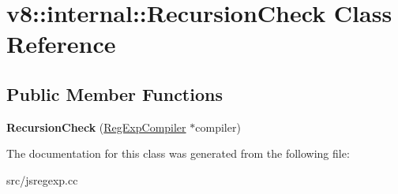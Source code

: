 \hypertarget{classv8_1_1internal_1_1_recursion_check}{}\section{v8\+:\+:internal\+:\+:Recursion\+Check Class Reference}
\label{classv8_1_1internal_1_1_recursion_check}
\subsection*{Public Member Functions}
\begin{DoxyCompactItemize}
\item 
\hypertarget{classv8_1_1internal_1_1_recursion_check_a35c0b952b582e12ff1307c6e804b4d90}{}{\bfseries Recursion\+Check} (\hyperlink{classv8_1_1internal_1_1_reg_exp_compiler}{Reg\+Exp\+Compiler} $\ast$compiler)\label{classv8_1_1internal_1_1_recursion_check_a35c0b952b582e12ff1307c6e804b4d90}

\end{DoxyCompactItemize}


The documentation for this class was generated from the following file\+:\begin{DoxyCompactItemize}
\item 
src/jsregexp.\+cc\end{DoxyCompactItemize}
